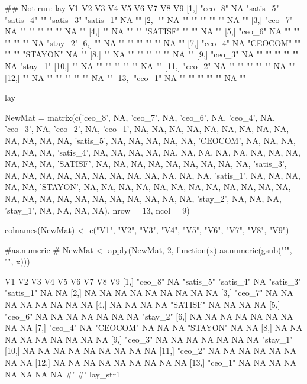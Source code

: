 \documentclass[a4paper]{book}
\begin{document}
\begin{Examples}
\begin{ExampleCode}

## Not run: 
lay
V1      V2 V3        V4        V5       V6        V7        V8 V9
[1,] "ceo_8" NA "satis_5" "satis_4" ""       "satis_3" "satis_1" NA ""
[2,] ""      NA ""        ""        ""       ""        ""        NA ""
[3,] "ceo_7" NA ""        ""        ""       ""        ""        NA ""
[4,] ""      NA ""        ""        "SATISF" ""        ""        NA ""
[5,] "ceo_6" NA ""        ""        ""       ""        ""        NA "stay_2"
[6,] ""      NA ""        ""        ""       ""        ""        NA ""
[7,] "ceo_4" NA "CEOCOM"  ""        ""       ""        "STAYON"  NA ""
[8,] ""      NA ""        ""        ""       ""        ""        NA ""
[9,] "ceo_3" NA ""        ""        ""       ""        ""        NA "stay_1"
[10,] ""      NA ""        ""        ""       ""        ""        NA ""
[11,] "ceo_2" NA ""        ""        ""       ""        ""        NA ""
[12,] ""      NA ""        ""        ""       ""        ""        NA ""
[13,] "ceo_1" NA ""        ""        ""       ""        ""        NA ""

lay %


NewMat = matrix(c('ceo_8', NA, 'ceo_7', NA, 'ceo_6',
NA, 'ceo_4', NA, 'ceo_3', NA, 'ceo_2', NA, 'ceo_1',
NA, NA, NA, NA, NA, NA, NA, NA, NA, NA, NA, NA, NA,
'satis_5', NA, NA, NA, NA, NA, 'CEOCOM', NA, NA, NA,
NA, NA, NA, 'satis_4', NA, NA, NA, NA, NA, NA, NA,
 NA, NA, NA, NA, NA, NA, NA, NA, 'SATISF', NA, NA,
  NA, NA, NA, NA, NA, NA, NA, 'satis_3', NA, NA,
  NA, NA, NA, NA, NA, NA, NA, NA, NA, NA, 'satis_1',
  NA, NA, NA, NA, NA, 'STAYON', NA, NA, NA, NA, NA,
  NA, NA, NA, NA, NA, NA, NA, NA, NA, NA, NA, NA,
   NA, NA, NA, NA, NA, NA, 'stay_2', NA, NA, NA,
   'stay_1', NA, NA, NA, NA), nrow = 13, ncol = 9)


colnames(NewMat) <- c("V1", "V2", "V3", "V4", "V5", "V6", "V7", "V8", "V9")

#as.numeric
# NewMat <- apply(NewMat, 2, function(x) as.numeric(gsub("'", "", x)))

V1      V2 V3        V4        V5       V6        V7        V8 V9
[1,] "ceo_8" NA "satis_5" "satis_4" NA       "satis_3" "satis_1" NA NA
[2,] NA      NA NA        NA        NA       NA        NA        NA NA
[3,] "ceo_7" NA NA        NA        NA       NA        NA        NA NA
[4,] NA      NA NA        NA        "SATISF" NA        NA        NA NA
[5,] "ceo_6" NA NA        NA        NA       NA        NA        NA "stay_2"
[6,] NA      NA NA        NA        NA       NA        NA        NA NA
[7,] "ceo_4" NA "CEOCOM"  NA        NA       NA        "STAYON"  NA NA
[8,] NA      NA NA        NA        NA       NA        NA        NA NA
[9,] "ceo_3" NA NA        NA        NA       NA        NA        NA "stay_1"
[10,] NA      NA NA        NA        NA       NA        NA        NA NA
[11,] "ceo_2" NA NA        NA        NA       NA        NA        NA NA
[12,] NA      NA NA        NA        NA       NA        NA        NA NA
[13,] "ceo_1" NA NA        NA        NA       NA        NA        NA NA
#' #'
 lay_str1 %



\end{ExampleCode}
\end{Examples}
\end{document}
